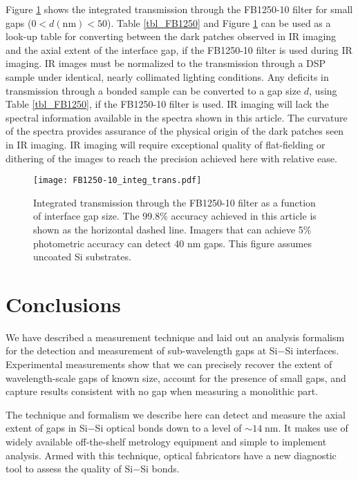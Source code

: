 \documentclass[osajnl,twocolumn,showpacs,superscriptaddress,11pt]{revtex4-1} %
\begin{document}
Figure \ref{figFB1250-10_integ} shows the integrated transmission through the FB1250-10 filter for small gaps ($0 < d(\mathrm{nm}) < 50$).  Table \ref{tbl_FB1250} and Figure \ref{figFB1250-10_integ} can be used as a look-up table for converting between the dark patches observed in IR imaging and the axial extent of the interface gap, if the FB1250-10 filter is used during IR imaging.  IR images must be normalized to the transmission through a DSP sample under identical, nearly collimated lighting conditions.  Any deficits in transmission through a bonded sample can be converted to a gap size $d$, using Table \ref{tbl_FB1250}, if the FB1250-10 filter is used.  IR imaging will lack the spectral information available in the spectra shown in this article.  The curvature of the spectra provides assurance of the physical origin of the dark patches seen in IR imaging.  IR imaging will require exceptional quality of flat-fielding or dithering of the images to reach the precision achieved here with relative ease.  

\begin{figure}[!htbp]
\texttt{[image: FB1250-10\_integ\_trans.pdf]}
\caption{\label{figFB1250-10_integ} Integrated transmission through the FB1250-10 filter as a function of interface gap size.  The 99.8\% accuracy achieved in this article is shown as the horizontal dashed line.  Imagers that can achieve 5\% photometric accuracy can detect 40 nm gaps.  This figure assumes uncoated Si substrates.}
\end{figure}

\section{Conclusions}
We have described a measurement technique and laid out an analysis formalism for the detection and measurement of sub-wavelength gaps at Si$-$Si interfaces.  Experimental measurements show that we can precisely recover the extent of wavelength-scale gaps of known size, account for the presence of small gaps, and capture results consistent with no gap when measuring a monolithic part.

The technique and formalism we describe here can detect and measure the axial extent of gaps in Si$-$Si optical bonds down to a level of $\sim14\;$nm.  It makes use of widely available off-the-shelf metrology equipment and simple to implement analysis.  Armed with this technique, optical fabricators have a new diagnostic tool to assess the quality of Si$-$Si bonds.
\end{document}
